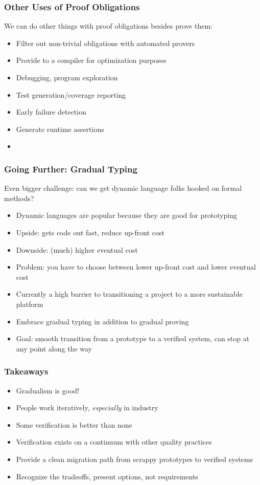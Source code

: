 \documentclass{beamer}
\begin{document}
\begin{frame}
  \frametitle{Other Uses of Proof Obligations}

  We can do other things with proof obligations besides prove them:
  \begin{itemize}
    \item Filter out non-trivial obligations with automated provers
    \item Provide to a compiler for optimization purposes
    \item Debugging, program exploration
    \item Test generation/coverage reporting
    \item Early failure detection
    \item Generate runtime assertions
    \item <insert potential thesis topic here>
  \end{itemize}
\end{frame}

\begin{frame}
  \frametitle{Going Further: Gradual Typing}

  Even bigger challenge: can we get dynamic language folks hooked on
  formal methods?
  \begin{itemize}
    \item Dynamic languages are popular because they are good for prototyping
    \item Upside: gets code out fast, reduce up-front cost
    \item Downside: (much) higher eventual cost
    \item Problem: you have to choose between lower up-front cost and
      lower eventual cost
    \item Currently a high barrier to transitioning a project to a
      more sustainable platform
    \item Embrace gradual typing in addition to gradual proving
    \item Goal: smooth transition from a prototype to a verified
      system, can stop at any point along the way
  \end{itemize}
\end{frame}

\begin{frame}
  \frametitle{Takeaways}
  \begin{itemize}
    \item Gradualism is good!
    \item People work iteratively, \emph{especially} in industry
    \item Some verification is better than none
    \item Verification exists on a continuum with other quality practices
    \item Provide a clean migration path from scrappy prototypes to
      verified systems
    \item Recognize the tradeoffs, present options, not requirements
  \end{itemize}
\end{frame}
\end{document}
